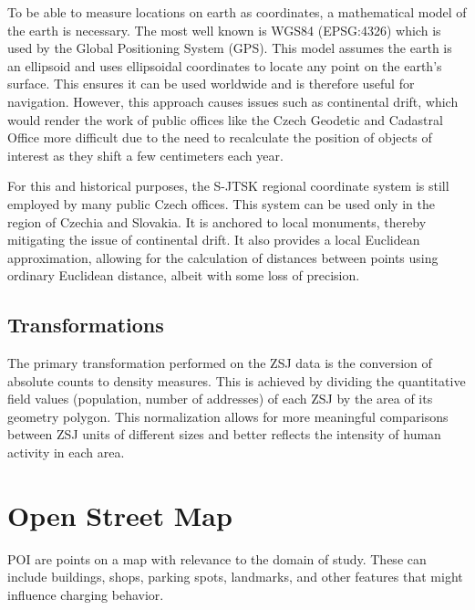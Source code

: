\begin{kaobox}[frametitle=Coordinate reference system - WGS84 and S-JTSK coordinate system]
    To be able to measure locations on earth as coordinates, a mathematical model of the earth is necessary. The most well known is WGS84 (EPSG:4326)  which is used by the Global Positioning System (GPS). This model assumes the earth is an ellipsoid and uses ellipsoidal coordinates to locate any point on the earth's surface. This ensures it can be used worldwide and is therefore useful for navigation. However, this approach causes issues such as continental drift, which would render the work of public offices like the Czech Geodetic and Cadastral Office more difficult due to the need to recalculate the position of objects of interest as they shift a few centimeters each year.

    For this and historical purposes, the S-JTSK  regional coordinate system is still employed by many public Czech offices. This system can be used only in the region of Czechia and Slovakia. It is anchored to local monuments, thereby mitigating the issue of continental drift. It also provides a local Euclidean approximation, allowing for the calculation of distances between points using ordinary Euclidean distance, albeit with some loss of precision.
\end{kaobox}

\subsection{Transformations}

The primary transformation performed on the ZSJ data is the conversion of absolute counts to density measures. This is achieved by dividing the quantitative field values (population, number of addresses) of each ZSJ by the area of its geometry polygon. This normalization allows for more meaningful comparisons between ZSJ units of different sizes and better reflects the intensity of human activity in each area.

\section{Open Street Map}

\acrfull{POI} are points on a map with relevance to the domain of study. These can include buildings, shops, parking spots, landmarks, and other features that might influence charging behavior.

